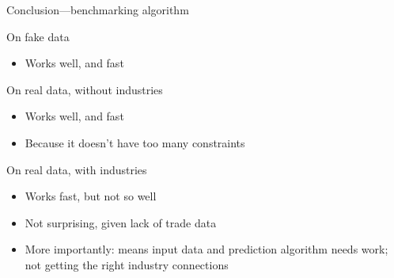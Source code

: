 \documentclass[12pt]{beamer}
\begin{document}
\begin{frame}{Conclusion---benchmarking algorithm}

\begin{block}{On fake data}
\begin{itemize}
\item Works well, and fast
\end{itemize}
\end{block}

\begin{block}{On real data, without industries}
\begin{itemize}
\item Works well, and fast
\item Because it doesn't have too many constraints
\end{itemize}
\end{block}

\begin{block}{On real data, with industries}
\begin{itemize}
\item Works fast, but not so well
\item Not surprising, given lack of trade data
\item More importantly: means input data and prediction algorithm needs work; not getting the right industry connections
\end{itemize}
\end{block}



\end{frame}


%
%
%

%
%
\end{document}
